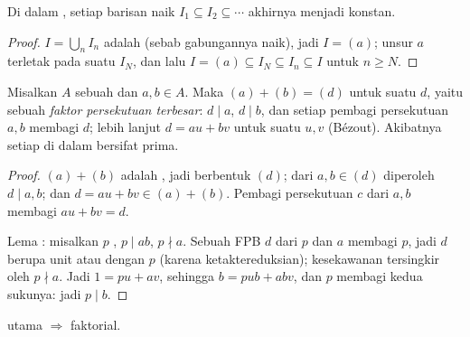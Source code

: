 \begin{lemma}
\label{lem:b3:rings:acc}
Di dalam , setiap barisan naik  $I_1 \subseteq I_2
\subseteq \cdots$ akhirnya menjadi konstan.
\end{lemma}

\begin{proof}
$I = \bigcup_n I_n$ adalah  (sebab gabungannya naik), jadi $I =
(a)$; unsur $a$ terletak pada suatu $I_N$, dan lalu $I = (a)
\subseteq I_N \subseteq I_n \subseteq I$ untuk $n \geq N$.
\end{proof}

\begin{lemma}\label{lem:b3:rings:bezout}
Misalkan $A$ sebuah  dan $a, b \in A$. Maka $(a) + (b) = (d)$ untuk suatu
$d$, yaitu sebuah \emph{faktor persekutuan terbesar}: $d \mid a$, $d \mid b$, dan setiap pembagi persekutuan $a, b$
membagi $d$; lebih lanjut $d = au + bv$ untuk suatu $u, v$
(Bézout). Akibatnya setiap  di dalam  bersifat
prima.
\end{lemma}

\begin{proof}
$(a) + (b)$ adalah , jadi berbentuk $(d)$; dari $a, b \in (d)$ diperoleh $d \mid
a, b$; dan $d = au + bv \in (a) + (b)$. Pembagi persekutuan $c$ dari
$a, b$ membagi $au + bv = d$.

Lema : misalkan $p$ , $p \mid ab$, $p \nmid a$. Sebuah FPB
$d$ dari $p$ dan $a$ membagi $p$, jadi $d$ berupa unit atau 
dengan $p$ (karena ketaktereduksian); kesekawanan tersingkir oleh $p \nmid a$. Jadi
$1 = pu + av$, sehingga $b = pub + abv$, dan $p$ membagi kedua sukunya:
jadi $p \mid b$.
\end{proof}

\begin{theorem}\label{thm:b3:rings:pidufd}
 utama $\Rightarrow$ faktorial.
\end{theorem}

